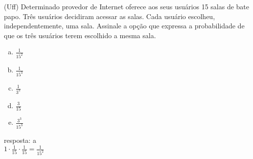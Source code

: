 \begin{ex}
(Uff) Determinado provedor de Internet oferece aos seus usuários 15 salas de bate papo. Três usuários decidiram acessar as salas. Cada usuário escolheu, independentemente, uma sala. Assinale a opção que expressa a probabilidade de que os três usuários terem escolhido a mesma sala.
   \begin{enumerate}[(a)]
   \item $\frac{1}{15^2}$
   \item $\frac{1}{15^3}$
   \item $\frac{1}{3^3}$
   \item $\frac{3}{15}$
   \item $\frac{3^3}{{15}^3}$
   \end{enumerate}
     \begin{sol}
      resposta: a \\
      $1\cdot\frac{1}{15}\cdot\frac{1}{15 }=\frac{1}{15^2}$
     \end{sol}
\end{ex}